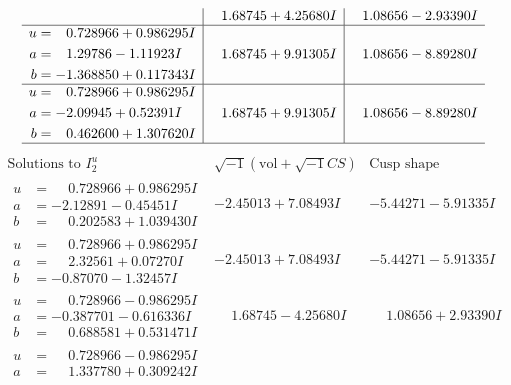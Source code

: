 \documentclass[1p]{elsarticle_modified}
\theoremstyle{definition}
\newcommand{\I}{\sqrt{-1}}
\begin{document}
$$\begin{array}{c|c|c}
 & \phantom{-}1.68745 + 4.25680 I & \phantom{-}1.08656 - 2.93390 I \\ \hline\begin{aligned}
u &= \phantom{-}0.728966 + 0.986295 I \\
a &= \phantom{-}1.29786 - 1.11923 I \\
b &= -1.368850 + 0.117343 I\end{aligned}
 & \phantom{-}1.68745 + 9.91305 I & \phantom{-}1.08656 - 8.89280 I \\ \hline\begin{aligned}
u &= \phantom{-}0.728966 + 0.986295 I \\
a &= -2.09945 + 0.52391 I \\
b &= \phantom{-}0.462600 + 1.307620 I\end{aligned}
 & \phantom{-}1.68745 + 9.91305 I & \phantom{-}1.08656 - 8.89280 I\\
 \hline 
 \end{array}$$\newpage$$\begin{array}{c|c|c}  
\text{Solutions to }I^u_{2}& \I (\text{vol} + \sqrt{-1}CS) & \text{Cusp shape}\\
 \hline 
\begin{aligned}
u &= \phantom{-}0.728966 + 0.986295 I \\
a &= -2.12891 - 0.45451 I \\
b &= \phantom{-}0.202583 + 1.039430 I\end{aligned}
 & -2.45013 + 7.08493 I & -5.44271 - 5.91335 I \\ \hline\begin{aligned}
u &= \phantom{-}0.728966 + 0.986295 I \\
a &= \phantom{-}2.32561 + 0.07270 I \\
b &= -0.87070 - 1.32457 I\end{aligned}
 & -2.45013 + 7.08493 I & -5.44271 - 5.91335 I \\ \hline\begin{aligned}
u &= \phantom{-}0.728966 - 0.986295 I \\
a &= -0.387701 - 0.616336 I \\
b &= \phantom{-}0.688581 + 0.531471 I\end{aligned}
 & \phantom{-}1.68745 - 4.25680 I & \phantom{-}1.08656 + 2.93390 I \\ \hline\begin{aligned}
u &= \phantom{-}0.728966 - 0.986295 I \\
a &= \phantom{-}1.337780 + 0.309242 I \\

\end{aligned}
\end{array}$$
\end{document}
